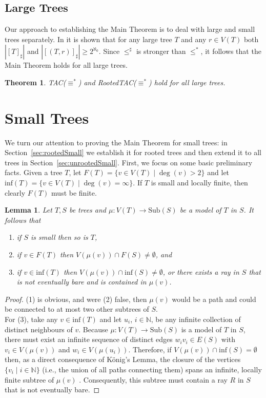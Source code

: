 \documentclass[12pt]{amsart}
\newtheorem{theorem}{Theorem}[section]
\newtheorem{lemma}{Lemma}[section]
\numberwithin{mytheorem}{section} %
\numberwithin{mylemma}{section} %
\numberwithin{mycorollary}{section} %
\newcommand{\N}{\mathbb{N}}
\begin{document}
\subsection{Large Trees} Our approach to establishing the Main Theorem is to deal with large and small trees separately. In \cite{BP1} it is shown that for any large tree $T$ and any $r\in V(T)$ both $|[T]_\sharp|$ and $|[(T,r)]_\sharp| \geq 2^{\aleph_0}$. Since $\leq^\sharp$ is stronger than $\leq^*$, it follows that the Main Theorem holds for all large trees.

\begin{theorem}\label{thm:large} TAC($\equiv^*$) and RootedTAC($\equiv^*$) hold for all large trees.
\end{theorem}

\section{Small Trees}

We turn our attention to proving the Main Theorem for small trees: in Section~\ref{sec:rootedSmall} we establish it for rooted trees and then extend it to all trees in Section~\ref{sec:unrootedSmall}. First, we focus on some basic preliminary facts. Given a tree $T$, let $F(T) = \{v\in V(T)\mid \deg(v)>2\}$ and let $\text{inf}(T) = \{v\in V(T) \mid \deg(v) = \infty\}$. If $T$ is small and locally finite, then clearly $F(T)$ must be finite.

\begin{lemma}\label{lem:basics} Let $T,S$ be trees and $\mu:V(T) \to \text{Sub}(S)$ be a model of $T$ in $S$. It follows that 
\begin{enumerate}
\item if $S$ is small then so is $T$,
\item if $v\in F(T)$ then $V(\mu(v)) \cap F(S) \not = \emptyset$, and
\medskip
\item if $v\in \text{inf}(T)$ then $V(\mu(v)) \cap \text{inf}(S) \not = \emptyset$, or there exists a ray in $S$ that is not eventually bare and is contained in $\mu(v)$.
\end{enumerate}
\end{lemma}
\begin{proof} (1) is obvious, and were (2) false, then $\mu(v)$ would be a path and could be connected to at most two other subtrees of $S$.\\

For (3), take any $v\in \text{inf}(T)$ and let $u_i$, $i\in \N$, be any infinite collection of distinct neighbours of $v$. Because $\mu:V(T) \to \text{Sub}(S)$ is a model of $T$ in $S$, there must exist an infinite sequence of distinct edges $w_iv_i \in E(S)$ with $v_i \in V(\mu(v))$ and $w_i\in V(\mu(u_i))$. Therefore, if $V(\mu(v))\cap \text{inf}(S)=\emptyset$ then, as a direct consequence of König's Lemma, the closure of the vertices $\{v_i \mid i \in \N\}$ (i.e., the union of all paths connecting them) spans an infinite, locally finite subtree of $\mu(v)$ . Consequently, this subtree must contain a ray $R$ in $S$ that is not eventually bare.
\end{proof}
\end{document}

